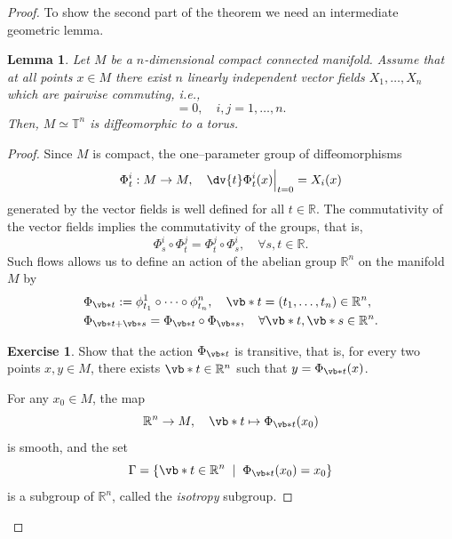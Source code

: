 \documentclass[english,fontsize=11pt,paper=b5]{scrbook}
\newtheorem{lemma}[theorem]{Lemma}
\theoremstyle{definition}
\newtheorem{exercise}{Exercise}[chapter]
\begin{document}
\begin{proof}
        To show the second part of the theorem we need an intermediate geometric lemma.
        \begin{lemma}\label{lemma:isotn}
          Let $M$ be a $n$-dimensional compact connected manifold.
          Assume that at all points $x\in M$ there exist $n$ linearly independent vector fields $X_1, \ldots, X_n$ which are pairwise commuting, i.e.,
          \begin{equation}
            [X_i, X_j] = 0, \quad i,j = 1,\ldots,n.
          \end{equation}
          Then, $M \simeq \mathbb{T}^n$ is diffeomorphic to a torus.
        \end{lemma}
        \begin{proof}
          Since $M$ is compact, the one--parameter group of diffeomorphisms
          \begin{equation}
            \Phi_t^i: M \to M, \quad \dv{t} \Phi_t^i(x)\Big|_{t=0} = X_i(x)
          \end{equation}
          generated by the vector fields is well defined for all $t\in\mathbb{R}$.
          The commutativity of the vector fields implies the commutativity of the groups, that is,
          \begin{equation}
            \Phi^i_s \circ \Phi^j_t = \Phi^j_t \circ \Phi^i_s, \quad \forall s,t\in\mathbb{R}.
          \end{equation}
          Such flows allows us to define an action of the abelian group $\mathbb{R}^n$ on the manifold $M$ by
          \begin{align}
       & \Phi_{\vb*{t}} := \phi_{t_1}^1 \circ \cdots \circ \phi_{t_n}^n, \quad \vb*{t} = (t_1, \ldots, t_n)\in \mathbb{R}^n, \\
       & \Phi_{\vb* t + \vb* s} = \Phi_{\vb* t} \circ \Phi_{\vb* s}, \quad \forall \vb* t, \vb* s \in \mathbb{R}^n.
          \end{align}

          \begin{exercise}
            Show that the action $\Phi_{\vb* t}$ is transitive, that is, for every two points $x, y\in M$, there exists $\vb* t\in\mathbb{R}^n$ such that $y = \Phi_{\vb* t} (x)$.
          \end{exercise}

          For any $x_0 \in M$, the map
          \begin{equation}\label{eq:diffeoRnM}
            \mathbb{R}^n \to M, \quad \vb* t \mapsto \Phi_{\vb* t}(x_0)
          \end{equation}
          is smooth, and the set
          \begin{equation}
            \Gamma = \left\{ \vb* t \in \mathbb{R}^n \;\mid\; \Phi_{\vb* t}(x_0) = x_0\right\}
          \end{equation}
          is a subgroup of $\mathbb{R}^n$, called the \emph{isotropy} subgroup.


\end{proof}
\end{proof}
\end{document}

